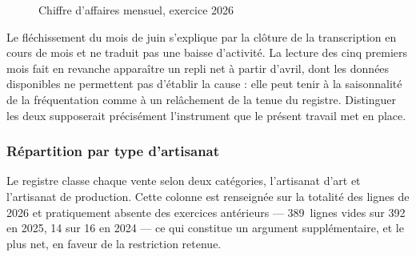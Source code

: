 \begin{figure}[H]
\centering
{}
\caption{Chiffre d'affaires mensuel, exercice 2026}
\label{fig:camensuel}
\end{figure}

Le fléchissement du mois de juin s'explique par la clôture de la transcription en cours de mois et ne traduit pas une baisse d'activité. La lecture des cinq premiers mois fait en revanche apparaître un repli net à partir d'avril, dont les données disponibles ne permettent pas d'établir la cause : elle peut tenir à la saisonnalité de la fréquentation comme à un relâchement de la tenue du registre. Distinguer les deux supposerait précisément l'instrument que le présent travail met en place.

\subsubsection{Répartition par type d'artisanat}

Le registre classe chaque vente selon deux catégories, l'artisanat d'art et l'artisanat de production. Cette colonne est renseignée sur la totalité des lignes de 2026 et pratiquement absente des exercices antérieurs --- 389~lignes vides sur 392 en 2025, 14 sur 16 en 2024 --- ce qui constitue un argument supplémentaire, et le plus net, en faveur de la restriction retenue.

